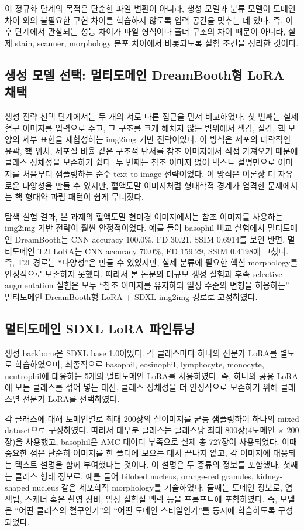 \documentclass[11pt]{article}
\begin{document}
이 정규화 단계의 목적은 단순한 파일 변환이 아니라, 생성 모델과 분류 모델이 도메인 차이 외의 불필요한 구현 차이를 학습하지 않도록 입력 공간을 맞추는 데 있다. 즉, 이후 단계에서 관찰되는 성능 차이가 파일 형식이나 폴더 구조의 차이 때문이 아니라, 실제 stain, scanner, morphology 분포 차이에서 비롯되도록 실험 조건을 정리한 것이다.

\subsection{생성 모델 선택: 멀티도메인 DreamBooth형 LoRA 채택}

생성 전략 선택 단계에서는 두 개의 서로 다른 접근을 먼저 비교하였다. 첫 번째는 실제 혈구 이미지를 입력으로 주고, 그 구조를 크게 해치지 않는 범위에서 색감, 질감, 핵 모양의 세부 표현을 재합성하는 img2img 기반 전략이었다. 이 방식은 세포의 대략적인 윤곽, 핵 위치, 세포질 비율 같은 구조적 단서를 참조 이미지에서 직접 가져오기 때문에 클래스 정체성을 보존하기 쉽다. 두 번째는 참조 이미지 없이 텍스트 설명만으로 이미지를 처음부터 샘플링하는 순수 text-to-image 전략이었다. 이 방식은 이론상 더 자유로운 다양성을 만들 수 있지만, 혈액도말 이미지처럼 형태학적 경계가 엄격한 문제에서는 핵 형태와 과립 패턴이 쉽게 무너졌다.

탐색 실험 결과, 본 과제의 혈액도말 현미경 이미지에서는 참조 이미지를 사용하는 img2img 기반 전략이 훨씬 안정적이었다. 예를 들어 basophil 비교 실험에서 멀티도메인 DreamBooth는 CNN accuracy $100.0\%$, FD 30.21, SSIM 0.6914를 보인 반면, 멀티도메인 T2I LoRA는 CNN accuracy $70.0\%$, FD 159.29, SSIM 0.4198에 그쳤다. 즉, T2I 경로는 ``다양성''은 만들 수 있었지만, 실제 분류에 필요한 핵심 morphology를 안정적으로 보존하지 못했다. 따라서 본 논문의 대규모 생성 실험과 후속 selective augmentation 실험은 모두 ``참조 이미지를 유지하되 일정 수준의 변형을 허용하는'' 멀티도메인 DreamBooth형 LoRA + SDXL img2img 경로로 고정하였다.

\subsection{멀티도메인 SDXL LoRA 파인튜닝}

생성 backbone은 SDXL base 1.0이었다. 각 클래스마다 하나의 전문가 LoRA를 별도로 학습하였으며, 최종적으로 basophil, eosinophil, lymphocyte, monocyte, neutrophil에 대응하는 5개의 멀티도메인 LoRA를 사용하였다. 즉, 하나의 공용 LoRA에 모든 클래스를 섞어 넣는 대신, 클래스 정체성을 더 안정적으로 보존하기 위해 클래스별 전문가 LoRA를 선택하였다.

각 클래스에 대해 도메인별로 최대 200장의 실이미지를 균등 샘플링하여 하나의 mixed dataset으로 구성하였다. 따라서 대부분 클래스는 클래스당 최대 800장(4도메인 $\times$ 200장)을 사용했고, basophil은 AMC 데이터 부족으로 실제 총 727장이 사용되었다. 이때 중요한 점은 단순히 이미지를 한 폴더에 모으는 데서 끝나지 않고, 각 이미지에 대응되는 텍스트 설명을 함께 부여했다는 것이다. 이 설명은 두 종류의 정보를 포함했다. 첫째는 클래스 형태 정보로, 예를 들어 bilobed nucleus, orange-red granules, kidney-shaped nucleus 같은 세포학적 morphology를 기술하였다. 둘째는 도메인 정보로, 염색법, 스캐너 혹은 촬영 장비, 임상 실험실 맥락 등을 프롬프트에 포함하였다. 즉, 모델은 ``어떤 클래스의 혈구인가''와 ``어떤 도메인 스타일인가''를 동시에 학습하도록 구성되었다.
\end{document}
